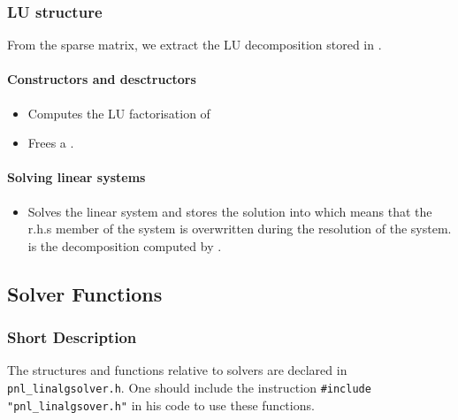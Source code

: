 \subsubsection{LU structure}

From the sparse matrix, we extract the LU decomposition stored in .
\paragraph{Constructors and desctructors}
\begin{itemize}
\item {}
  \sshortdescribe Computes the LU factorisation of 

\item {}
  \sshortdescribe Frees a .
\end{itemize}

\paragraph{Solving linear systems}

\begin{itemize}
\item {}
  \sshortdescribe Solves the linear system  and stores the solution 
  into  which means that the r.h.s member of the system is overwritten
  during the resolution of the system.  is the decomposition computed by
  .
\end{itemize}


\subsection{Solver Functions}
\subsubsection{Short Description}

The structures and functions relative to solvers are declared in
\verb!pnl_linalgsolver.h!. One should include the instruction
\verb!#include "pnl_linalgsover.h"! in his code to use these functions.


